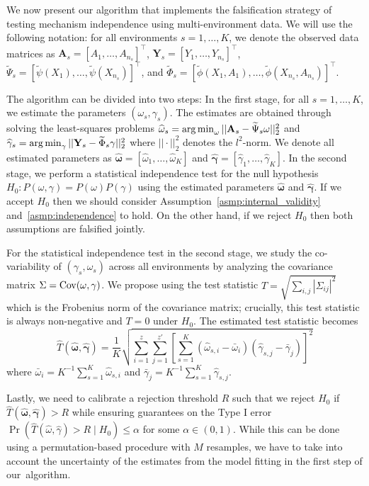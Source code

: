\documentclass{article}
\begin{document}
We now present our algorithm that implements the falsification strategy of testing mechanism independence using multi-environment data. We will use the following notation: for all environments $s=1,\dots,K$, we denote the observed data matrices as $\mathbf{A}_s = [A_1,\dots,A_{n_s}]^\top$, $\mathbf{Y}_s = [Y_1,\dots,Y_{n_s}]^\top$, $
\widetilde\Psi_s=[\widetilde\psi(X_1),\dots, \widetilde\psi(X_{n_s})]^\top$, and $\widetilde\Phi_s = [\widetilde\phi(X_1,A_1),\dots, \widetilde\phi(X_{n_s}, A_{n_s})]^\top$. 

The algorithm can be divided into two steps: In the first stage, for all $s=1,\dots,K$, we estimate the parameters $(\omega_s,\gamma_s)$. The estimates are obtained through solving the least-squares problems $\widehat{\omega}_s = \operatorname*{arg\,min}_{\omega} || \mathbf{A}_s - \widetilde\Psi_s \omega||_2^2$ and $\widehat{\gamma}_s = \operatorname*{arg\,min}_{\gamma}|| \mathbf{Y}_s -  \widetilde\Phi_s\gamma||_2^2$ where $||\cdot||_2^2$ denotes the $l^2$-norm. We denote all estimated parameters as $\widehat{\boldsymbol{\omega}}=[\widehat{\omega}_1,\dots, \widehat{\omega}_K]$ and $\widehat{\boldsymbol{\gamma}}=[\widehat{\gamma}_1,\dots, \widehat{\gamma}_K]$. In the second stage, we perform a statistical independence test for the null hypothesis $H_0 : P(\omega, \gamma) =P(\omega)P(\gamma)$ using the estimated parameters $\widehat{\boldsymbol{\omega}}$ and $\widehat{\boldsymbol{\gamma}}$. If we accept $H_0$ then we should consider Assumption~\ref*{asmp:internal_validity} and~\ref*{asmp:independence} to hold. On the other hand, if we reject $H_0$ then both assumptions are falsified jointly.

For the statistical independence test in the second stage, we study the co-variability of $(\gamma_s, \omega_s)$ across all environments by analyzing the covariance matrix $\Sigma=\mathrm{Cov}(\omega, \gamma)$. We propose using the test statistic $T=\sqrt{\sum_{i,j}|\Sigma_{ij}|^2}$ which is the Frobenius norm of the covariance matrix; crucially, this test statistic is always non-negative and $T=0$ under $H_0$. The estimated test statistic becomes 
$$\widehat{T}(\widehat{\boldsymbol{\omega}},\widehat{\boldsymbol{\gamma}})=\frac{1}{K}\sqrt{\sum_{i=1}^{z}\sum_{j=1}^{z'} \left[\sum_{s=1}^K (\widehat{\omega}_{s,i}-\bar{\omega}_{i})(\widehat{\gamma}_{s,j}-\bar{\gamma}_{j})\right]^2}$$
where $\bar{\omega}_{i}=K^{-1}\sum_{s=1}^{K}\widehat{\omega}_{s,i}$ and $\bar{\gamma}_{j}=K^{-1}\sum_{s=1}^{K}\widehat{\gamma}_{s,j}$. 


Lastly, we need to calibrate a rejection threshold $R$ such that we reject $H_0$ if $\widehat{T}(\widehat{\boldsymbol{\omega}},\widehat{\boldsymbol{\gamma}}) > R$ while ensuring guarantees on the Type I error $\Pr(\widehat{T}(\widehat{\omega}, \widehat{\gamma}) > R \mid H_0) \leq \alpha$ for some $\alpha\in(0,1)$. While this can be done using a permutation-based procedure with $M$ resamples,  we have to take into account the uncertainty of the estimates from the model fitting in the first step of our~algorithm. 
\end{document}
